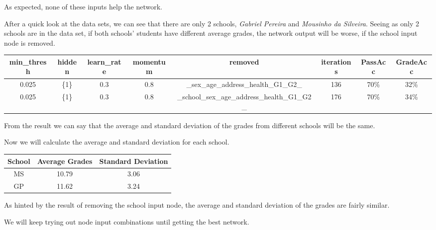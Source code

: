 \documentclass[11pt]{article}
\begin{document}
As expected, none of these inputs help the network.
\hfill \break
\hfill \break

After a quick look at the data sets, we can see that there are only 2 schools, \textit{Gabriel Pereira} and \textit{Mousinho da Silveira}. Seeing as only 2 schools are in the data set, if both schools' students have different average grades, the network output will be worse, if the school input node is removed.

\begin{tabular}{| c | c | c | c | c | c | c | c |}
\hline \textbf{min\_thresh} & \textbf{hidden} & \textbf{learn\_rate} & \textbf{momentum} & \textbf{removed} & \textbf{iterations} & \textbf{PassAcc} & \textbf{GradeAcc}\\
\hline 0.025 & \{1\} & 0.3 & 0.8 & \_sex\_age\_address\_health\_G1\_G2\_ & 136 & 70\% & 32\%\\
\hline 0.025 & \{1\} & 0.3 & 0.8 & \_school\_sex\_age\_address\_health\_G1\_G2\_ & 176 & 70\% & 34\%\\
\hline
\end{tabular}

From the result we can say that the average and standard deviation of the grades from different schools will be the same.

Now we will calculate the average and standard deviation for each school.

\begin{tabular}{| c | c | c |}
\hline \textbf{School} & \textbf{Average Grades} & \textbf{Standard Deviation}\\
\hline MS & 10.79 & 3.06\\
\hline GP & 11.62 & 3.24\\
\hline
\end{tabular}
As hinted by the result of removing the school input node, the average and standard deviation of the grades are fairly similar.

We will keep trying out node input combinations until getting the best network.
\end{document}
